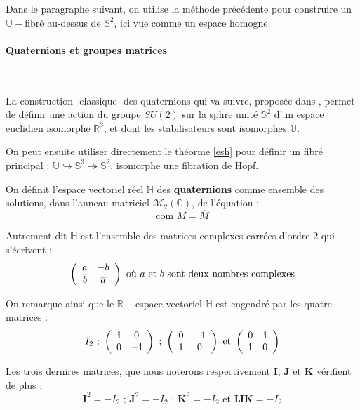 
Dans le paragraphe suivant, on utilise la m\'ethode pr\'ec\'edente pour construire un $\mathbb{U}-$fibr\'e au-dessus de $\mathbb{S}^2$, ici vue comme un espace homogne.

\paragraph{Quaternions et groupes matrices}~\\

\par
La construction -classique- des quaternions qui va suivre, propos\'ee dans \cite{dev_par}, %
permet de d\'efinir une action du groupe $SU(2)$ sur la sphre unit\'e $\mathbb{S}^2$ d'un espace euclidien isomorphe  $\mathbb{R}^3$, %
et dont les stabilisateurs sont isomorphes  $\mathbb{U}$.

\par
On peut ensuite utiliser directement le th\'eorme \ref{esh} pour d\'efinir un fibr\'e principal : $\mathbb{U}\hookrightarrow\mathbb{S}^3\twoheadrightarrow\mathbb{S}^2$, %
isomorphe  une fibration de Hopf.

\ligneinter
On d\'efinit l'espace vectoriel r\'eel $\mathbb{H}$ des \textbf{quaternions} comme ensemble des solutions, %
dans l'anneau matriciel $\mathcal{M}_2(\mathbb{C})$, de l'\'equation :
\[\text{com }M=\overline{M}\]

Autrement dit $\mathbb{H}$ est l'ensemble des matrices complexes carr\'ees d'ordre $2$ qui s'\'ecrivent :
\[\left(\begin{array}{cc}a&-b\\ \overline{b}&\overline{a}\end{array}\right)\text{ o\`u $a$ et $b$ sont deux nombres complexes}\]

On remarque ainsi que le $\mathbb{R}-$espace vectoriel $\mathbb{H}$ est engendr\'e par les quatre matrices :
\[I_2\text{ ; }\left(\begin{array}{cc}\mathbf{i}&0\\0&-\mathbf{i}\end{array}\right)\text{ ; }\left(\begin{array}{cc}0&-1\\1&0\end{array}\right)\text{ et }\left(\begin{array}{cc}0&\mathbf{i}\\\mathbf{i}&0\end{array}\right)\]

Les trois dernires matrices, que nous noterons respectivement $\mathbf{I}$, $\mathbf{J}$ et $\mathbf{K}$ v\'erifient de plus :
\[\mathbf{I}^2=-I_2\text{ ; }\mathbf{J}^2=-I_2\text{ ; }\mathbf{K}^2=-I_2\text{ et }\mathbf{IJK}=-I_2\]

